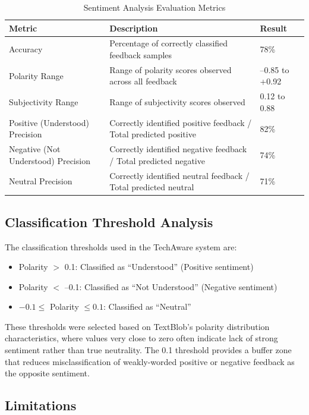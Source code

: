 \begin{table}[H]
\centering
\caption{Sentiment Analysis Evaluation Metrics}
\begin{tabularx}{\textwidth}{|p{4cm}|X|p{3cm}|}
\hline
\textbf{Metric} & \textbf{Description} & \textbf{Result} \\
\hline
Accuracy & Percentage of correctly classified feedback samples & 78\% \\
\hline
Polarity Range & Range of polarity scores observed across all feedback & --0.85 to +0.92 \\
\hline
Subjectivity Range & Range of subjectivity scores observed & 0.12 to 0.88 \\
\hline
Positive (Understood) Precision & Correctly identified positive feedback / Total predicted positive & 82\% \\
\hline
Negative (Not Understood) Precision & Correctly identified negative feedback / Total predicted negative & 74\% \\
\hline
Neutral Precision & Correctly identified neutral feedback / Total predicted neutral & 71\% \\
\hline
\end{tabularx}
\end{table}

\subsection{Classification Threshold Analysis}

The classification thresholds used in the TechAware system are:

\begin{itemize}
    \item Polarity $>$ 0.1: Classified as ``Understood'' (Positive sentiment)
    \item Polarity $<$ --0.1: Classified as ``Not Understood'' (Negative sentiment)
    \item $-0.1 \leq$ Polarity $\leq 0.1$: Classified as ``Neutral''
\end{itemize}

These thresholds were selected based on TextBlob's polarity distribution characteristics, where values very close to zero often indicate lack of strong sentiment rather than true neutrality. The 0.1 threshold provides a buffer zone that reduces misclassification of weakly-worded positive or negative feedback as the opposite sentiment.

\subsection{Limitations}

